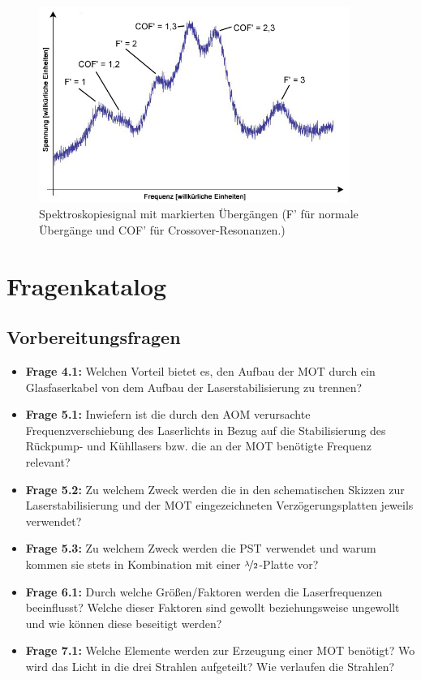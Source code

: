 \documentclass[
class=book,
accentcolor=1b,
custommargins=geometry,
fontsize=11pt,
thesis={type=Versuchsanleitung},
ruledheaders=all,
headline=false,
instbox=false,
marginpar=false,
title=small,
ignore-missing-data=true,
twoside=false,
logofile=apqdesign/tuda_logo.pdf,
pdfa=false %
]{apqpub}
\begin{document}
					\begin{figure}[htb!]
						\centering
						\includegraphics[width = 0.9\textwidth]{graphics/SCO.jpg}
						\caption{Spektroskopiesignal mit markierten Übergängen (F' für normale Übergänge und COF' für Crossover-Resonanzen.)}
						\label{fig:COF}
					\end{figure}
					\chapter{Fragenkatalog}\label{sec:FK}			
					\section{Vorbereitungsfragen}
					\begin{itemize}
						\item \textbf{Frage 4.1:} Welchen Vorteil bietet es, den Aufbau der MOT durch ein Glasfaserkabel von dem Aufbau der Laserstabilisierung zu trennen?		
						\item \textbf{Frage 5.1:} Inwiefern ist die durch den AOM verursachte Frequenzverschiebung des Laserlichts in Bezug auf die Stabilisierung des Rückpump- und Kühllasers bzw. die an der MOT benötigte Frequenz relevant?
						\item \textbf{Frage 5.2:} Zu welchem Zweck werden die in den schematischen Skizzen zur Laserstabilisierung und der MOT eingezeichneten Verzögerungsplatten jeweils verwendet?
						\item \textbf{Frage 5.3:} Zu welchem Zweck werden die PST verwendet und warum kommen sie stets in Kombination mit einer $\nicefrac{\lambda}{2}$-Platte vor? 
						\item \textbf{Frage 6.1:} Durch welche Größen/Faktoren werden die Laserfrequenzen beeinflusst? Welche dieser Faktoren sind gewollt beziehungsweise ungewollt und wie können diese beseitigt werden?
						\item \textbf{Frage 7.1:} Welche Elemente werden zur Erzeugung einer MOT benötigt? Wo wird das Licht in die drei Strahlen aufgeteilt? Wie verlaufen die Strahlen?
					\end{itemize}
					
\end{document}
